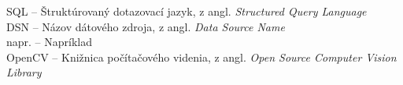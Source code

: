 SQL -- Štruktúrovaný dotazovací jazyk, z angl. \emph{\foreignlanguage{english}{Structured Query Language}}\\
DSN -- Názov dátového zdroja, z angl. \emph{\foreignlanguage{english}{Data Source Name}}\\
napr. -- Napríklad\\
OpenCV -- Knižnica počítačového videnia, z angl. \emph{\foreignlanguage{english}{Open Source Computer Vision Library}}\\
